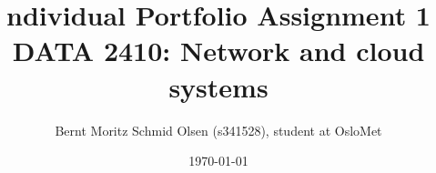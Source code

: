 \documentclass[11pt]{article}
\title{ndividual Portfolio Assignment 1 \newline DATA 2410: Network and cloud systems}
\author{Bernt Moritz Schmid Olsen (s341528), student at OsloMet}
\date{\today}
\begin{document}
    \begin{titlepage}
        \maketitle
    \end{titlepage}
\end{document}
